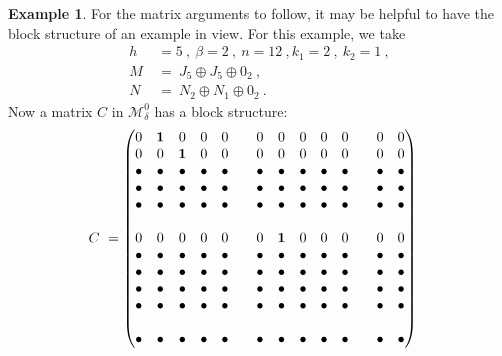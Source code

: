 \documentclass{amsart}
\theoremstyle{definition}
\newtheorem{example}[theorem]{Example}
\theoremstyle{remark}
\numberwithin{equation}{section}
\begin{document}
{{\begin{example} \label{blockexample} 
For the matrix arguments to follow, it may be helpful to 
have the block structure of an example in view. 
For this example, we take 
\begin{align*} 
h \ & =  5 \ , \ \beta =2 \ , \ n=12 \ , k_1= 2 \ , \ k_2=1\ , \\ 
M \ &=\ J_5 \oplus J_5\oplus 0_2 \ , \\ 
N\ &=\ N_2 \oplus N_1 \oplus 0_2 \ .
\end{align*} 
Now a matrix $C$ in $\mathcal M^0_{\delta }$ has a block structure: 
\begin{align*}\label{samplec} 
\setcounter{MaxMatrixCols}{14} 
C\ &= 
\begin{pmatrix} 
0&\mathbf 1 &0&0&0&& 0&0&0&0&0&& 0&0 \\
0&0&\mathbf 1 &0&0&& 0&0&0&0&0&& 0&0 \\ 
{\bullet} &{\bullet} &{\bullet} &{\bullet} &{\bullet} & &{\bullet} &{\bullet} &{\bullet} &{\bullet} &{\bullet} & &{\bullet} &{\bullet} \\ 
{\bullet} &{\bullet} &{\bullet} &{\bullet} &{\bullet} & &{\bullet} &{\bullet} &{\bullet} &{\bullet} &{\bullet} & &{\bullet} &{\bullet} \\ 
{\bullet} &{\bullet} &{\bullet} &{\bullet} &{\bullet} & &{\bullet} &{\bullet} &{\bullet} &{\bullet} &{\bullet} & &{\bullet} &{\bullet} \\ 
 & & & & &  & & & & &  & & & \\
0&0&0& 0&0& &0&\mathbf 1 &0&0&0& &0&0 \\
{\bullet} &{\bullet} &{\bullet} &{\bullet} &{\bullet} & &{\bullet} &{\bullet} &{\bullet} &{\bullet} &{\bullet} & &{\bullet} &{\bullet} \\ 
{\bullet} &{\bullet} &{\bullet} &{\bullet} &{\bullet} & &{\bullet} &{\bullet} &{\bullet} &{\bullet} &{\bullet} & &{\bullet} &{\bullet} \\ 
{\bullet} &{\bullet} &{\bullet} &{\bullet} &{\bullet} & &{\bullet} &{\bullet} &{\bullet} &{\bullet} &{\bullet} & &{\bullet} &{\bullet} \\ 
{\bullet} &{\bullet} &{\bullet} &{\bullet} &{\bullet} & &{\bullet} &{\bullet} &{\bullet} &{\bullet} &{\bullet} & &{\bullet} &{\bullet} \\ 
 & & & & &  & & & & &  & & & \\
{\bullet} &{\bullet} &{\bullet} &{\bullet} &{\bullet} & &{\bullet} &{\bullet} &{\bullet} &{\bullet} &{\bullet} & &{\bullet} &{\bullet} \\ 

\end{pmatrix}
\end{align*}
\end{example}}}
\end{document}
